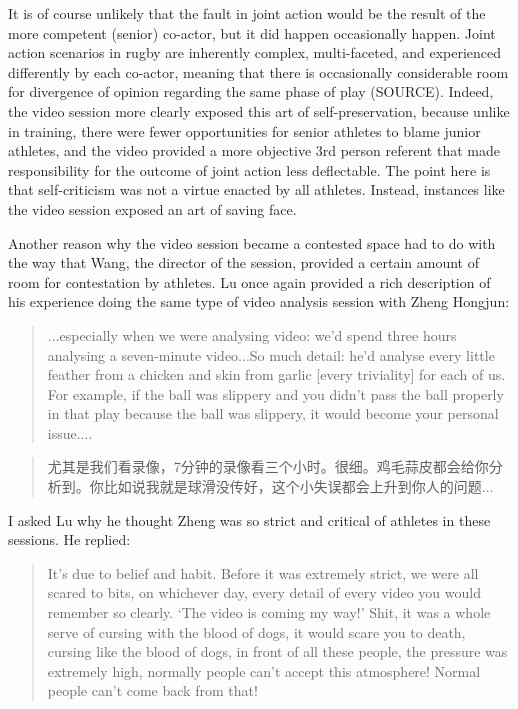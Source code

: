 \begin{CJK}{UTF8}{gbsn}
It is of course unlikely that the fault in joint action would be the result of the more competent (senior) co-actor, but it did happen occasionally happen.  Joint action scenarios in rugby are inherently complex, multi-faceted, and experienced differently by each co-actor, meaning that there is occasionally considerable room for divergence of opinion regarding the same phase of play (SOURCE).  Indeed, the video session more clearly exposed this art of self-preservation, because unlike in training, there were fewer opportunities for senior athletes to blame junior athletes, and the video provided a more objective 3rd person referent that made responsibility for the outcome of joint action less deflectable.  The point here is that self-criticism was not a virtue enacted by all athletes. Instead, instances like the video session exposed an art of saving face.


Another reason why the video session became a contested space had to do with the way that Wang, the director of the session, provided a certain amount of room for contestation by athletes. Lu once again provided a rich description of his experience doing the same type of video analysis session with Zheng Hongjun:

\begin{quotation}
  ...especially when we were analysing video: we'd spend three hours analysing a seven-minute video...So much detail: he'd analyse every little feather from a chicken and skin from garlic [every triviality] for each of us. For example, if the ball was slippery and you didn't pass the ball properly in that play because the ball was slippery, it would become your personal issue....
\end{quotation}

\begin{quotation}
    尤其是我们看录像，7分钟的录像看三个小时。很细。鸡毛蒜皮都会给你分析到。你比如说我就是球滑没传好，这个小失误都会上升到你人的问题...
\end{quotation}


I asked Lu why he thought Zheng was so strict and critical of athletes in these sessions.  He replied:

\begin{quotation}
    It's due to belief and habit. Before it was extremely strict, we were all scared to bits, on whichever day, every detail of every video you would remember so clearly. `The video is coming my way!'  Shit, it was a whole serve of cursing with the blood of dogs, it would scare you to death, cursing like the blood of dogs, in front of all these people, the pressure was extremely high, normally people can’t accept this atmosphere! Normal people can’t come back from that!
\end{quotation}



\end{CJK}
